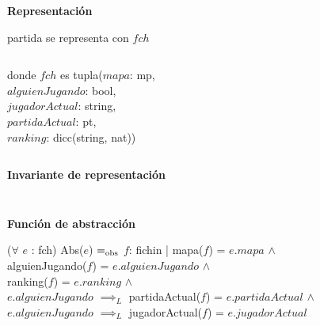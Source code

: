\documentclass{book}
\begin{document}
    \newpage

    \textbf{Representación}

    partida se representa con $fch$

    $ $

    donde $fch$ es tupla($mapa$: mp, \\
        \text{}\qquad\quad$alguienJugando$: bool, \\
        \text{}\qquad\quad$jugadorActual$: string, \\
        \text{}\qquad\quad$partidaActual$: pt, \\
        \text{}\qquad\quad$ranking$: dicc(string, nat))

    $ $

    \textbf{Invariante de representación}



    $ $

    $ $

    \textbf{Función de abstracción}

        ($\forall$ $e$ : fch) Abs($e$) $=_{\mathrm{obs}}$ $f$: fichin | mapa($f$) = $e.mapa$ $\wedge$ \\
            \text{}\quad\qquad alguienJugando($f$) = $e.alguienJugando$ $\wedge$ \\
            \text{}\quad\qquad ranking($f$) = $e.ranking$ $\wedge$ \\
            \text{}\quad\qquad $e.alguienJugando$ $\implies_L$ partidaActual($f$) = $e.partidaActual$ $\wedge$ \\
            \text{}\quad\qquad $e.alguienJugando$ $\implies_L$ jugadorActual($f$) = $e.jugadorActual$
\end{document}
